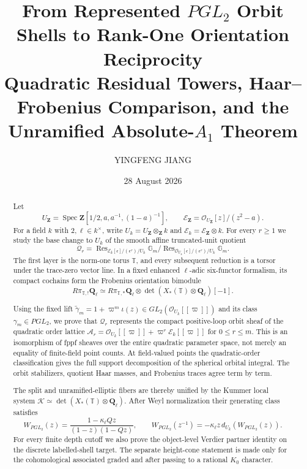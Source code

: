 \documentclass[11pt]{article}
\title{From Represented $PGL_2$ Orbit Shells to Rank-One Orientation Reciprocity\\
\large Quadratic Residual Towers, Haar--Frobenius Comparison, and the
Unramified Absolute-$A_1$ Theorem}
\author{YINGFENG JIANG}
\date{28 August 2026}
\theoremstyle{definition}
\theoremstyle{remark}
\newcommand{\Qell}{\mathbf Q_\ell}
\newcommand{\UZ}{U_{\mathbf Z}}
\newcommand{\Uk}{U_k}
\newcommand{\kappaell}{\kappa_{\ell}}
\newcommand{\cK}{\mathcal K}
\newcommand{\Spec}{\operatorname{Spec}}
\begin{document}
\maketitle

\begin{abstract}
Let
\[
 \UZ=\Spec\mathbf Z[1/2,a,a^{-1},(1-a)^{-1}],\qquad
 \mathcal E_{\mathbf Z}=\mathcal O_{\UZ}[z]/(z^2-a).
\]
For a field $k$ with $2,\ell\in k^\times$, write
$\Uk=\UZ\otimes_{\mathbf Z}k$ and
$\mathcal E_k=\mathcal E_{\mathbf Z}\otimes k$.  For every $r\geq1$ we
study the base change to $\Uk$ of the smooth affine truncated-unit quotient
\[
 \mathscr Q_r=
 \operatorname{Res}_{\mathcal E_k[\epsilon]/(\epsilon^r)/\Uk}\mathbb G_m
 \big/
 \operatorname{Res}_{\mathcal O_{\Uk}[\epsilon]/(\epsilon^r)/\Uk}\mathbb G_m.
\]
The first layer is the norm-one torus $\mathbb T$, and every subsequent
reduction is a torsor under the trace-zero vector line.  In a fixed enhanced
$\ell$-adic six-functor formalism, its compact cochains form the Frobenius
orientation bimodule
\[
 R\pi_{\mathbb T,!}\Qell
 \simeq R\pi_{\mathbb T,*}\Qell\otimes
 \det(X_*(\mathbb T)\otimes\Qell)[-1].
\]

Using the fixed lift
$\widetilde\gamma_m=1+\varpi^m\iota(z)\in
GL_2(\mathcal O_{\Uk}[[\varpi]])$
and its class $\gamma_m\in PGL_2$, we prove that $\mathscr Q_r$ represents
the compact positive-loop orbit sheaf of the quadratic order lattice
$\mathcal A_r=\mathcal O_{\Uk}[[\varpi]]+\varpi^r\mathcal E_k[[\varpi]]$ for
$0\leq r\leq m$.  This is an isomorphism of fppf sheaves over the entire
quadratic parameter space, not merely an equality of finite-field point
counts.  At field-valued points the quadratic-order classification gives the
full support decomposition of the spherical orbital integral.  The orbit
stabilizers, quotient Haar masses, and Frobenius traces agree term by term.

The split and unramified-elliptic fibers are thereby unified by the Kummer
local system
$\cK\simeq\det(X_*(\mathbb T)\otimes\Qell)$.  After Weyl normalization their
generating class satisfies
\[
 W_{PGL_2}(z)=\frac{1-\kappaell Qz}{(1-z)(1-Qz)},\qquad
 W_{PGL_2}(z^{-1})=-\kappaell z\,d_{\Uk}(W_{PGL_2}(z)).
\]
For every finite depth cutoff we also prove the object-level Verdier partner
identity on the discrete labelled-shell target.  The separate height-cone
statement is made only for the cohomological associated graded and after
passing to a rational $K_0$ character.


\end{abstract}
\end{document}

